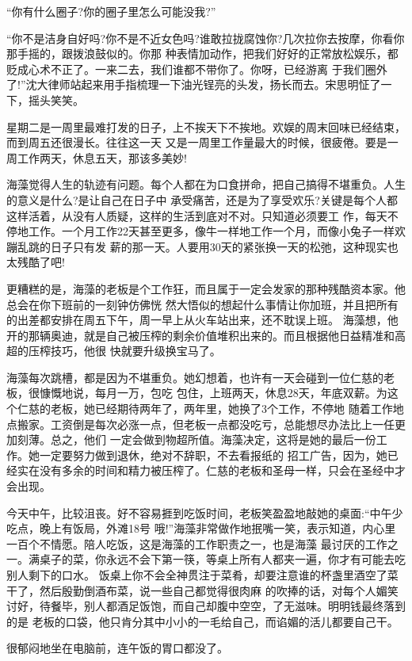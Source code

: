 \documentclass[11pt,a4paper,onecolumn]{article}
\begin{document}
``你有什么圈子?你的圈子里怎么可能没我?''

``你不是洁身自好吗?你不是不近女色吗?谁敢拉拢腐蚀你?几次拉你去按摩，你看你那手摇的，跟拨浪鼓似的。你那
种表情加动作，把我们好好的正常放松娱乐，都贬成心术不正了。一来二去，我们谁都不带你了。你呀，已经游离
于我们圈外了!''沈大律师站起来用手指梳理一下油光锃亮的头发，扬长而去。宋思明怔了一下，摇头笑笑。

星期二是一周里最难打发的日子，上不挨天下不挨地。欢娱的周末回味已经结束，而到周五还很漫长。往往这一天
又是一周里工作量最大的时候，很疲倦。要是一周工作两天，休息五天，那该多美妙!

海藻觉得人生的轨迹有问题。每个人都在为口食拼命，把自己搞得不堪重负。人生的意义是什么?是让自己在日子中
承受痛苦，还是为了享受欢乐?关键是每个人都这样活着，从没有人质疑，这样的生活到底对不对。只知道必须要工
作，每天不停地工作。一个月工作22天甚至更多，像牛一样地工作一个月，而像小兔子一样欢蹦乱跳的日子只有发
薪的那一天。人要用30天的紧张换一天的松弛，这种现实也太残酷了吧!

更糟糕的是，海藻的老板是个工作狂，而且属于一定会发家的那种残酷资本家。他总会在你下班前的一刻钟仿佛恍
然大悟似的想起什么事情让你加班，并且把所有的出差都安排在周五下午，周一早上从火车站出来，还不耽误上班。
海藻想，他开的那辆奥迪，就是自己被压榨的剩余价值堆积出来的。而且根据他日益精准和高超的压榨技巧，他很
快就要升级换宝马了。

海藻每次跳槽，都是因为不堪重负。她幻想着，也许有一天会碰到一位仁慈的老板，很慷慨地说，每月一万，包吃
包住，上班两天，休息28天，年底双薪。为这个仁慈的老板，她已经期待两年了，两年里，她换了3个工作，不停地
随着工作地点搬家。工资倒是每次必涨一点，但老板一点都没吃亏，总能想尽办法比上一任更加刻薄。总之，他们
一定会做到物超所值。海藻决定，这将是她的最后一份工作。她一定要努力做到退休，绝对不辞职，不去看报纸的
招工广告，因为，她已经实在没有多余的时间和精力被压榨了。仁慈的老板和圣母一样，只会在圣经中才会出现。

今天中午，比较沮丧。好不容易捱到吃饭时间，老板笑盈盈地敲她的桌面:``中午少吃点，晚上有饭局，外滩18号
哦!''海藻非常做作地抿嘴一笑，表示知道，内心里一百个不情愿。陪人吃饭，这是海藻的工作职责之一，也是海藻
最讨厌的工作之一。满桌子的菜，你永远不会下第一筷，等桌上所有人都夹一遍，你才有可能去吃别人剩下的口水。
饭桌上你不会全神贯注于菜肴，却要注意谁的杯盏里酒空了菜干了，然后殷勤倒酒布菜，说一些自己都觉得很肉麻
的吹捧的话，对每个人媚笑讨好，待餐毕，别人都酒足饭饱，而自己却腹中空空，了无滋味。明明钱最终落到的是
老板的口袋，他只肯分其中小小的一毛给自己，而谄媚的活儿都要自己干。

很郁闷地坐在电脑前，连午饭的胃口都没了。
\end{document}
